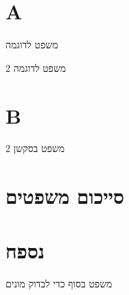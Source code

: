 
\setcounter{secnumdepth}{2}


\section{A}
\begin{theorem}
	משפט לדוגמה
\end{theorem}
\begin{theorem}
	משפט לדוגמה 2
\end{theorem}

\section{B}
\begin{theorem}
	משפט בסקשן 2
\end{theorem}

\section{סייכום משפטים}
 \thesection{}

\section{נספח}
\begin{theorem}
	משפט בסוף כדי לבדוק מונים
\end{theorem}


